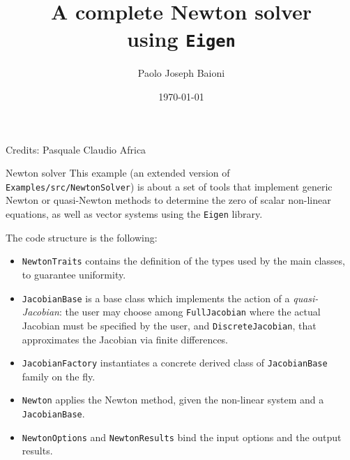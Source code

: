 \documentclass[10pt]{beamer}
\begin{document}
    \title{A complete Newton solver\protect\\ using \texttt{Eigen}}
    \author{Paolo Joseph Baioni}
    \date{\today}

\begin{frame}
    \maketitle
    \vfill
    {\footnotesize Credits: Pasquale Claudio Africa}
\end{frame}

\begin{frame}{Newton solver}
This example (an extended version of \texttt{Examples/src/NewtonSolver}) is about a set of tools that implement generic Newton or quasi-Newton methods to determine the zero of scalar non-linear equations, as well as vector systems using the \texttt{Eigen} library.

The code structure is the following:
\begin{itemize}
\item \texttt{NewtonTraits} contains the definition of the types used by the main classes, to guarantee uniformity.
\item \texttt{JacobianBase} is a base class which implements the action of a \textit{quasi-Jacobian}: the user may choose among \texttt{FullJacobian} where the actual Jacobian must be specified by the user, and \texttt{DiscreteJacobian}, that approximates the Jacobian via finite differences.
\item \texttt{JacobianFactory} instantiates a concrete derived class of \texttt{JacobianBase} family on the fly.
\item \texttt{Newton} applies the Newton method, given the non-linear system and a \texttt{JacobianBase}.
\item \texttt{NewtonOptions} and \texttt{NewtonResults} bind the input options and the output results.
\end{itemize}
\end{frame}
\end{document}
